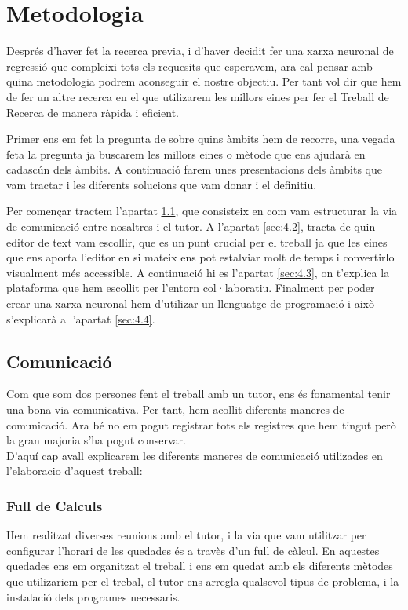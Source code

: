 \chapter{Metodologia}
\label{c:Metodologia}
Després d'haver fet la recerca previa, i d'haver decidit fer una xarxa neuronal de regressió que compleixi tots els requesits que esperavem, ara cal pensar amb quina metodologia podrem aconseguir el nostre objectiu. Per tant vol dir que hem de fer un altre recerca en el que utilizarem les millors eines per fer el Treball de Recerca de manera ràpida i eficient.


Primer ens em fet la pregunta de  sobre quins àmbits hem de recorre, una vegada feta la pregunta ja buscarem les millors eines o mètode que ens ajudarà en cadascún dels àmbits. A continuació farem unes presentacions dels àmbits que vam tractar i les diferents solucions que vam donar i el definitiu.

Per començar tractem  l'apartat \ref{sec:4.1}, que consisteix en com vam estructurar la via de comunicació entre nosaltres i el tutor. A l'apartat \ref{sec:4.2}, tracta de quin editor de text vam escollir, que es un punt crucial per el treball ja que les eines que ens aporta l'editor en si mateix ens pot estalviar molt de temps i convertirlo visualment més accessible. A continuació hi es l'apartat \ref{sec:4.3}, on t'explica la plataforma que hem escollit per l'entorn col·laboratiu. Finalment per poder crear una xarxa neuronal hem d'utilizar un llenguatge de programació i això s'explicarà a l'apartat \ref{sec:4.4}.



\section{Comunicació}\label{sec:4.1}
Com que som dos persones fent el treball amb un tutor, ens és fonamental tenir una bona via comunicativa. Per tant, hem acollit diferents maneres de comunicació. Ara bé no em pogut registrar tots els registres que hem tingut però la gran majoria s'ha pogut conservar.\\
D'aquí cap avall explicarem les diferents maneres de comunicació utilizades en l'elaboracio d'aquest treball:\\
\subsection{Full de Calculs}
Hem realitzat diverses reunions amb el tutor, i la via que vam utilitzar per configurar l'horari de les quedades és a travès d'un full de càlcul. En aquestes quedades ens em organitzat el treball i ens em quedat amb els diferents mètodes que utilizariem per el trebal, el tutor ens arregla qualsevol tipus de problema, i la instalació dels programes necessaris.
